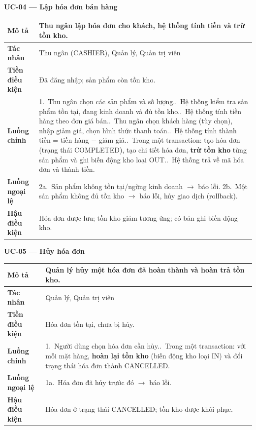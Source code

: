 \documentclass[12pt,a4paper]{report}
\newcommand{\ucfield}[1]{\textbf{#1}}
\begin{document}
\textbf{UC-04 --- Lập hóa đơn bán hàng}
\begin{table}[H]\centering\small
\begin{tabularx}{\textwidth}{|L{3cm}|X|}
\hline
\ucfield{Mô tả} & Thu ngân lập hóa đơn cho khách, hệ thống tính tiền và trừ tồn kho. \\ \hline
\ucfield{Tác nhân} & Thu ngân (CASHIER), Quản lý, Quản trị viên \\ \hline
\ucfield{Tiền điều kiện} & Đã đăng nhập; sản phẩm còn tồn kho. \\ \hline
\ucfield{Luồng chính} &
1.~Thu ngân chọn các sản phẩm và số lượng..~Hệ thống kiểm tra sản phẩm tồn tại, đang kinh doanh và đủ tồn kho..~Hệ thống tính tiền hàng theo đơn giá bán..~Thu ngân chọn khách hàng (tùy chọn), nhập giảm giá, chọn hình thức thanh toán..~Hệ thống tính thành tiền = tiền hàng $-$ giảm giá..~Trong một transaction: tạo hóa đơn (trạng thái COMPLETED), tạo chi tiết hóa đơn, \textbf{trừ tồn kho} từng sản phẩm và ghi biến động kho loại OUT..~Hệ thống trả về mã hóa đơn và thành tiền. \\ \hline
\ucfield{Luồng ngoại lệ} &
2a.~Sản phẩm không tồn tại/ngừng kinh doanh $\rightarrow$ báo lỗi.\newline
2b.~Một sản phẩm không đủ tồn kho $\rightarrow$ báo lỗi, hủy giao dịch (rollback). \\ \hline
\ucfield{Hậu điều kiện} & Hóa đơn được lưu; tồn kho giảm tương ứng; có bản ghi biến động kho. \\ \hline
\end{tabularx}
\end{table}

\textbf{UC-05 --- Hủy hóa đơn}
\begin{table}[H]\centering\small
\begin{tabularx}{\textwidth}{|L{3cm}|X|}
\hline
\ucfield{Mô tả} & Quản lý hủy một hóa đơn đã hoàn thành và hoàn trả tồn kho. \\ \hline
\ucfield{Tác nhân} & Quản lý, Quản trị viên \\ \hline
\ucfield{Tiền điều kiện} & Hóa đơn tồn tại, chưa bị hủy. \\ \hline
\ucfield{Luồng chính} &
1.~Người dùng chọn hóa đơn cần hủy..~Trong một transaction: với mỗi mặt hàng, \textbf{hoàn lại tồn kho} (biến động kho loại IN) và đổi trạng thái hóa đơn thành CANCELLED. \\ \hline
\ucfield{Luồng ngoại lệ} & 1a.~Hóa đơn đã hủy trước đó $\rightarrow$ báo lỗi. \\ \hline
\ucfield{Hậu điều kiện} & Hóa đơn ở trạng thái CANCELLED; tồn kho được khôi phục. \\ \hline
\end{tabularx}
\end{table}
\end{document}
